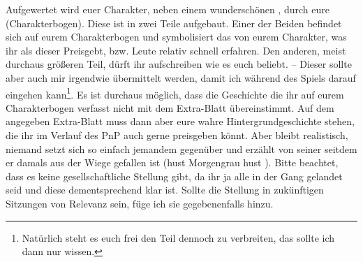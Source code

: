 Aufgewertet wird euer Charakter, neben einem wunderschönen , durch eure  (Charakterbogen). %
Diese ist in zwei Teile aufgebaut.
Einer der Beiden befindet sich auf eurem Charakterbogen und symbolisiert das von eurem Charakter, was ihr als dieser Preisgebt, bzw. Leute relativ schnell erfahren.
Den anderen, meist durchaus größeren Teil, dürft ihr aufschreiben wie es euch beliebt. 
-- Dieser sollte aber auch mir irgendwie übermittelt werden, damit ich während des Spiels darauf eingehen kann\footnote{Natürlich steht es euch frei den Teil dennoch zu verbreiten, das sollte ich dann nur wissen.}.
Es ist durchaus möglich, dass die Geschichte die ihr auf eurem Charakterbogen verfasst nicht mit dem Extra-Blatt übereinstimmt. Auf dem angegeben Extra-Blatt muss dann aber eure wahre Hintergrundgeschichte stehen, die ihr im Verlauf des PnP auch gerne preisgeben könnt. 
Aber bleibt realistisch, niemand setzt sich so einfach jemandem gegenüber und erzählt von seiner  seitdem er damals aus der Wiege gefallen ist (hust Morgengrau hust \Tongey).
Bitte beachtet, dass es keine gesellschaftliche Stellung gibt, da ihr ja alle in der Gang gelandet seid und diese dementsprechend klar ist. Sollte die Stellung in zukünftigen Sitzungen von Relevanz sein, füge ich sie gegebenenfalls hinzu.


